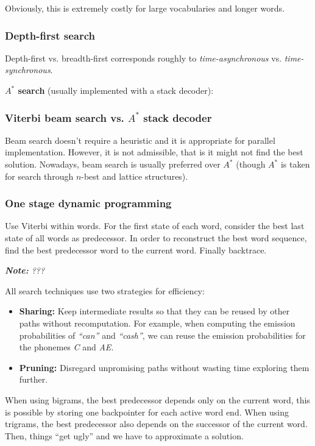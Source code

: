 Obviously, this is extremely costly for large vocabularies and longer words.

\subsubsection{Depth-first search}

Depth-first vs. breadth-first corresponds roughly to \textit{time-asynchronous} vs. \textit{time-synchronous}.

\textbf{$A^{\ast}$ search} (usually implemented with a stack decoder):

\subsubsection{Viterbi beam search vs. $A^{\ast}$ stack decoder}
Beam search doesn't require a heuristic and it is appropriate for parallel implementation. However, it is not admissible, that is it might not find the best solution. Nowadays, beam search is usually preferred over $A^{\ast}$ (though $A^{\ast}$ is taken for search through $n$-best and lattice structures).

\subsubsection{One stage dynamic programming}
Use Viterbi within words. For the first state of each word, consider the best last state of all words as predecessor. In order to reconstruct the best word sequence, find the best predecessor word to the current word. Finally backtrace.

\textit{\textbf{Note:} ???}

All search techniques use two strategies for efficiency:
\begin{itemize}
    \item \textbf{Sharing:} Keep intermediate results so that they can be reused by other paths without recomputation. For example, when computing the emission probabilities of \textit{``can''} and \textit{``cash''}, we can reuse the emission probabilities for the phonemes \textit{C} and \textit{AE}.
    \item \textbf{Pruning:} Disregard unpromising paths without wasting time exploring them further.
\end{itemize}

When using bigrams, the best predecessor depends only on the current word, this is possible by storing one backpointer for each active word end. When using trigrams, the best predecessor also depends on the successor of the current word. Then, things ``get ugly'' and we have to approximate a solution.

